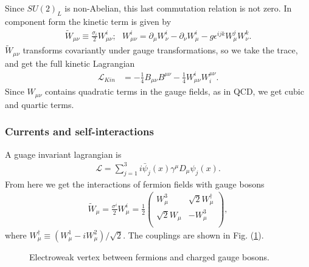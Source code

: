 \documentclass[11pt]{article}
\begin{document}
\begin{multicols}{2}
\begin{flushleft}
Since $SU(2)_L$ is non-Abelian, this last commutation relation is not zero. In component form the kinetic term is given by
\begin{align*}
\tilde{W}_{\mu \nu} \equiv \frac{\sigma_i}{2} W_{\mu \nu}^i; \text{ } W^i_{\mu \nu} = \partial_{\mu} W_{\nu}^i- \partial_{\nu} W_{\mu}^i - g \epsilon^{ijk}W_{\mu}^jW_{\nu}^k.
\end{align*}
$\tilde{W}_{\mu \nu}$ transforms covariantly under gauge transformations, so we take the trace, and get the full kinetic Lagrangian
\begin{align}\label{EW kin}
\mathcal{L}_{Kin} &= - \frac{1}{4} B_{\mu \nu} B^{\mu \nu} - \frac{1}{4} W_{\mu \nu}^i W^{\mu \nu}_i.
\end{align}
Since $W_{\mu\nu}$ contains quadratic terms in the gauge fields, as in QCD, we get cubic and quartic terms. 
\end{flushleft}

\subsubsection{Currents and self-interactions}
\begin{flushleft}
A guage invariant lagrangian is
\begin{align*}
\mathcal{L} = \sum_{j=1}^3 i \bar{\psi}_j(x) \gamma^{\mu} D_{\mu} \psi_j(x).
\end{align*}
From here we get the interactions of fermion fields with gauge bosons
\begin{align*}
\tilde{W}_{\mu} = \frac{\sigma^i}{2} W_{\mu}^i = \frac{1}{2} \begin{pmatrix}
W_{\mu}^3 & \sqrt{2} W_{\mu}^{\dagger}\\
\sqrt{2}W_{\mu} & -W_{\mu}^3\\
\end{pmatrix},
\end{align*}
where $W_{\mu}^{\dagger} \equiv (W_{\mu}^1-iW_{\mu}^2)/\sqrt{2}$. The couplings are shown in Fig. (\ref{fig::EW fermion-gauge}).
\end{flushleft}
\begin{figure}[H]
\centering
{}
\caption{Electroweak vertex between fermions and charged gauge bosons.}
\label{fig::EW fermion-gauge}
\end{figure}


\end{multicols}
\end{document}
